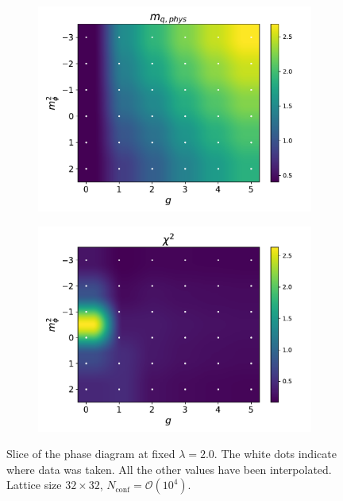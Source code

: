 \begin{figure}[]
\begin{subfigure}[b]{0.47\textwidth}
    \end{subfigure}
    \begin{subfigure}[b]{0.47\textwidth}
        \includegraphics[width=\textwidth]{figures/phase_diagram/g-m/phase_diagram_mqphys.pdf}
    \end{subfigure}
    \begin{subfigure}[b]{0.47\textwidth}
        \includegraphics[width=\textwidth]{figures/phase_diagram/g-m/phase_diagram_chi2.pdf}
    \end{subfigure}
    \caption[Phase diagram in the $g-m_\phi^2$ plane]{Slice of the phase diagram at fixed $\lambda = 2.0$. The white dots indicate where data was taken. All the other values have been interpolated. Lattice size $32 \times 32$, $N_\text{conf} = \mathcal{O}(10^4)$.}
    \label{fig:phase_diagram_g_m}
\end{figure}

